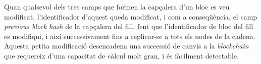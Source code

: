 Quan qualsevol dels tres camps que formen la capçalera d’un bloc es veu modificat, l’identificador d'aquest queda modificat, i com a conseqüència, el camp \textit{previous block hash} de la capçalera del fill, fent que l’identificador de bloc del fill es modifiqui, i així successivament fins a replicar-se a tots els nodes de la cadena.\\
\newline Aquesta petita modificació desencadena una successió de canvis a la \textit{blockchain} que requereix d’una capacitat de càlcul molt gran, i és fàcilment detectable.